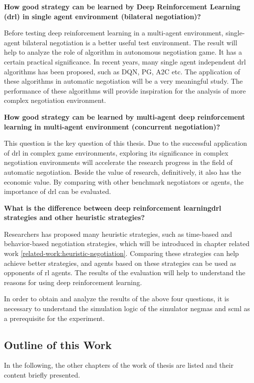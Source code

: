 \textbf{How good strategy can be learned by Deep Reinforcement Learning (\gls{drl}) in single agent environment (bilateral negotiation)?}

Before testing deep reinforcement learning in a multi-agent environment, single-agent bilateral negotiation is a better useful test environment. The result will help to analyze the role of algorithm in autonomous negotiation game. It has a certain practical significance. In recent years, many single agent independent \gls{drl} algorithms has been proposed, such as DQN, PG, A2C etc. The application of these algorithms in automatic negotiation will be a very meaningful study. The performance of these algorithms will provide inspiration for the analysis of more complex negotiation environment.

\textbf{How good strategy can be learned by multi-agent deep reinforcement learning in multi-agent environment (concurrent negotiation)?}

This question is the key question of this thesis. Due to the successful application of \gls{drl} in complex game environments, exploring its significance in complex negotiation environments will accelerate the research progress in the field of automatic negotiation. Beside the value of research, definitively, it also has the economic value. By comparing with other benchmark negotiators or agents, the importance of \gls{drl} can be evaluated.

\textbf{What is the difference between deep reinforcement learning\gls{drl} strategies and other heuristic strategies?}

Researchers has proposed many heuristic strategies, such as time-based and behavior-based negotiation strategies, which will be introduced in chapter related work \ref{related-work:heuristic-negotiation}. Comparing these strategies can help achieve better strategies, and agents based on these strategies can be used as opponents of \gls{rl} agents. The results of the evaluation will help to understand the reasons for using deep reinforcement learning.

In order to obtain and analyze the results of the above four questions, it is necessary to understand the simulation logic of the simulator \gls{negmas} and \gls{scml} as a prerequisite for the experiment.

\subsection{Outline of this Work}
In the following, the other chapters of the work of thesis are listed and their content briefly presented.

